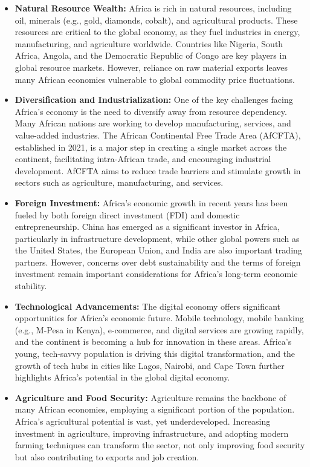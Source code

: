\documentclass[10pt]{article}
\begin{document}
\begin{itemize}
  \item \textbf{Natural Resource Wealth:} Africa is rich in natural resources, including oil, minerals (e.g.,
    gold, diamonds, cobalt), and agricultural products. These resources are critical to the
    global economy, as they fuel industries in energy, manufacturing, and agriculture
    worldwide. Countries like Nigeria, South Africa, Angola, and the Democratic Republic of
    Congo are key players in global resource markets. However, reliance on raw material
    exports leaves many African economies vulnerable to global commodity price
    fluctuations.

  \item \textbf{Diversification and Industrialization:} One of the key challenges facing Africa's economy
    is the need to diversify away from resource dependency. Many African nations are
    working to develop manufacturing, services, and value-added industries. The African
    Continental Free Trade Area (AfCFTA), established in 2021, is a major step in creating a
    single market across the continent, facilitating intra-African trade, and encouraging
    industrial development. AfCFTA aims to reduce trade barriers and stimulate growth in
    sectors such as agriculture, manufacturing, and services.

  \item \textbf{Foreign Investment:} Africa's economic growth in recent years has been fueled by both
    foreign direct investment (FDI) and domestic entrepreneurship. China has emerged as a
    significant investor in Africa, particularly in infrastructure development, while other
    global powers such as the United States, the European Union, and India are also
    important trading partners. However, concerns over debt sustainability and the terms of
    foreign investment remain important considerations for Africa's long-term economic
    stability.

  \item \textbf{Technological Advancements:} The digital economy offers significant opportunities for
    Africa's economic future. Mobile technology, mobile banking (e.g., M-Pesa in Kenya), e-commerce,
    and digital services are growing rapidly, and the continent is becoming a hub
    for innovation in these areas. Africa's young, tech-savvy population is driving this digital
    transformation, and the growth of tech hubs in cities like Lagos, Nairobi, and Cape Town
    further highlights Africa's potential in the global digital economy.

  \item \textbf{Agriculture and Food Security:} Agriculture remains the backbone of many African
    economies, employing a significant portion of the population. Africa's agricultural
    potential is vast, yet underdeveloped. Increasing investment in agriculture, improving
    infrastructure, and adopting modern farming techniques can transform the sector, not
    only improving food security but also contributing to exports and job creation.
\end{itemize}
\end{document}
